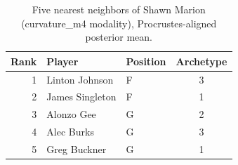 \begin{table}[htbp]
  \centering\small
  \begin{tabular}{rllc}
    \toprule
    Rank & Player & Position & Archetype \\
    \midrule
    1 & Linton Johnson & F & 3 \\
    2 & James Singleton & F & 1 \\
    3 & Alonzo Gee & G & 2 \\
    4 & Alec Burks & G & 3 \\
    5 & Greg Buckner & G & 1 \\
    \bottomrule
  \end{tabular}
  \caption{Five nearest neighbors of Shawn Marion (curvature_m4 modality), Procrustes-aligned posterior mean.}
  \label{tab:Shawn_Marion_neighbors_curvature_m4}
\end{table}

